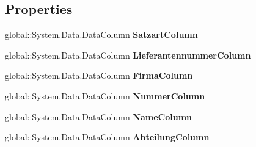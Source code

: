 \subsection*{Properties}
\begin{DoxyCompactItemize}
\item 
global\+::\+System.\+Data.\+Data\+Column {\bfseries Satzart\+Column}\hypertarget{class_products_1_1_data_1_1ds_sage_1_1_supplier_contact_data_table_a2ef0fdb500321c166de3b73ce8555c19}{}\label{class_products_1_1_data_1_1ds_sage_1_1_supplier_contact_data_table_a2ef0fdb500321c166de3b73ce8555c19}

\item 
global\+::\+System.\+Data.\+Data\+Column {\bfseries Lieferantennummer\+Column}\hypertarget{class_products_1_1_data_1_1ds_sage_1_1_supplier_contact_data_table_a7431e2fa6aa2328517f60519c01f50df}{}\label{class_products_1_1_data_1_1ds_sage_1_1_supplier_contact_data_table_a7431e2fa6aa2328517f60519c01f50df}

\item 
global\+::\+System.\+Data.\+Data\+Column {\bfseries Firma\+Column}\hypertarget{class_products_1_1_data_1_1ds_sage_1_1_supplier_contact_data_table_aea9a7f0be1225d402f79fe9e354bb3e4}{}\label{class_products_1_1_data_1_1ds_sage_1_1_supplier_contact_data_table_aea9a7f0be1225d402f79fe9e354bb3e4}

\item 
global\+::\+System.\+Data.\+Data\+Column {\bfseries Nummer\+Column}\hypertarget{class_products_1_1_data_1_1ds_sage_1_1_supplier_contact_data_table_a482db19bf4fb01386823598c6069eb9d}{}\label{class_products_1_1_data_1_1ds_sage_1_1_supplier_contact_data_table_a482db19bf4fb01386823598c6069eb9d}

\item 
global\+::\+System.\+Data.\+Data\+Column {\bfseries Name\+Column}\hypertarget{class_products_1_1_data_1_1ds_sage_1_1_supplier_contact_data_table_a88fe5f4fa009aee280a3056c8c8d5d0e}{}\label{class_products_1_1_data_1_1ds_sage_1_1_supplier_contact_data_table_a88fe5f4fa009aee280a3056c8c8d5d0e}

\item 
global\+::\+System.\+Data.\+Data\+Column {\bfseries Abteilung\+Column}\hypertarget{class_products_1_1_data_1_1ds_sage_1_1_supplier_contact_data_table_abc0111c2fa453f0f80f64d3a87294359}{}\label{class_products_1_1_data_1_1ds_sage_1_1_supplier_contact_data_table_abc0111c2fa453f0f80f64d3a87294359}


\end{DoxyCompactItemize}
